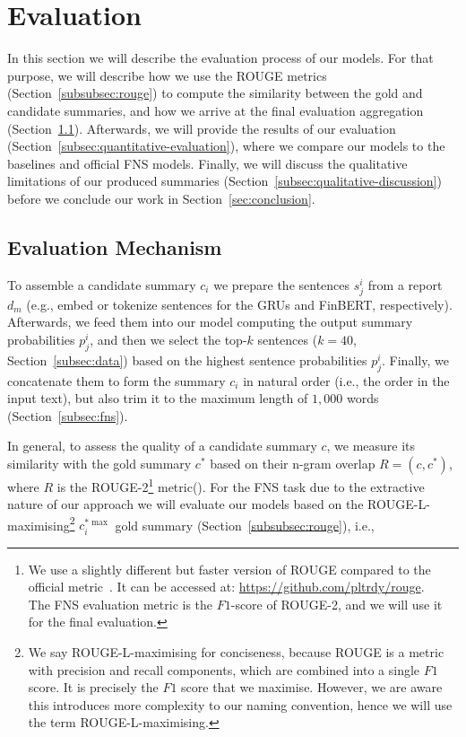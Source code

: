 \section{Evaluation}\label{sec:evaluation}
In this section we will describe the evaluation process of our models.
For that purpose, we will describe how we use the ROUGE metrics (Section~\ref{subsubsec:rouge}) to compute the
similarity between the gold and candidate summaries, and how we arrive at the final evaluation aggregation (Section~\ref{subsec:evaluation-mechanism}).
Afterwards, we will provide the results of our evaluation (Section~\ref{subsec:quantitative-evaluation}), where we compare our models to the baselines and official FNS models.
Finally, we will discuss the qualitative limitations of our produced summaries (Section~\ref{subsec:qualitative-discussion}) before we conclude our work in Section~\ref{sec:conclusion}.

\subsection{Evaluation Mechanism}\label{subsec:evaluation-mechanism}
To assemble a candidate summary $c_{i}$ we prepare the sentences $s_{j}^{i}$ from a report $d_{m}$ (e.g., embed or tokenize sentences for the GRUs and FinBERT, respectively).
Afterwards, we feed them into our model computing the output summary probabilities $p_{j}^{i}$, and then we select the
top-$k$ sentences ($k=40$, Section~\ref{subsec:data}) based on the highest sentence probabilities $p_{j}^{i}$.
Finally, we concatenate them to form the summary $c_{i}$ in natural order (i.e., the order in the input text),
but also trim it to the maximum length of $1,000$ words (Section~\ref{subsec:fns}).

In general, to assess the quality of a candidate summary $c$, we measure its similarity with the gold summary $c^{*}$
based on their n-gram overlap $R=(c, c^{*})$, where $R$ is the ROUGE-2\footnote{
        We use a slightly different but faster version of ROUGE compared to the official metric~\cite{lin2004rouge}.
        It can be accessed at: \url{https://github.com/pltrdy/rouge}. \\
        The FNS evaluation metric is the $F1$-score of ROUGE-2, and we will use it for the final evaluation.
} metric(\cite{lin2004rouge}).
For the FNS task due to the extractive nature of our approach we will evaluate our models based on
the ROUGE-L-maximising\footnote{
    We say ROUGE-L-maximising for conciseness, because ROUGE is a metric with precision and recall components, which are combined into a single $F1$ score.
    It is precisely the $F1$ score that we maximise.
    However, we are aware this introduces more complexity to our naming convention, hence we will use the term ROUGE-L-maximising.
} $c^{*\max}_{i}$ gold summary (Section~\ref{subsubsec:rouge}), i.e.,

